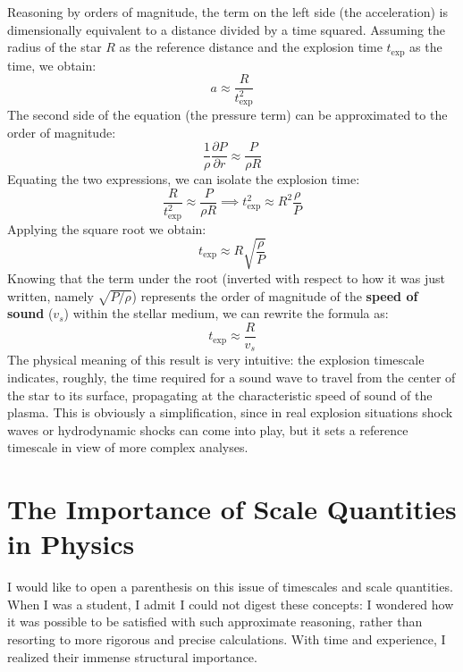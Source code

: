 Reasoning by orders of magnitude, the term on the left side (the acceleration) is dimensionally equivalent to a distance divided by a time squared. Assuming the radius of the star $R$ as the reference distance and the explosion time $t_{\text{exp}}$ as the time, we obtain:
\begin{equation}
a \approx \frac{R}{t_{\text{exp}}^2}
\end{equation}
The second side of the equation (the pressure term) can be approximated to the order of magnitude:
\begin{equation}
\frac{1}{\rho} \frac{\partial P}{\partial r} \approx \frac{P}{\rho R}
\end{equation}
Equating the two expressions, we can isolate the explosion time:
\begin{equation}
\frac{R}{t_{\text{exp}}^2} \approx \frac{P}{\rho R} \implies t_{\text{exp}}^2 \approx R^2 \frac{\rho}{P}
\end{equation}
Applying the square root we obtain:
\begin{equation}
t_{\text{exp}} \approx R \sqrt{\frac{\rho}{P}}
\end{equation}
Knowing that the term under the root (inverted with respect to how it was just written, namely $\sqrt{P/\rho}$) represents the order of magnitude of the \textbf{speed of sound} ($v_s$) within the stellar medium, we can rewrite the formula as:
\begin{equation}
t_{\text{exp}} \approx \frac{R}{v_s}
\end{equation}
The physical meaning of this result is very intuitive: the explosion timescale indicates, roughly, the time required for a sound wave to travel from the center of the star to its surface, propagating at the characteristic speed of sound of the plasma. This is obviously a simplification, since in real explosion situations shock waves or hydrodynamic shocks can come into play, but it sets a reference timescale in view of more complex analyses.

\section{The Importance of Scale Quantities in Physics}
I would like to open a parenthesis on this issue of timescales and scale quantities. When I was a student, I admit I could not digest these concepts: I wondered how it was possible to be satisfied with such approximate reasoning, rather than resorting to more rigorous and precise calculations. With time and experience, I realized their immense structural importance.

